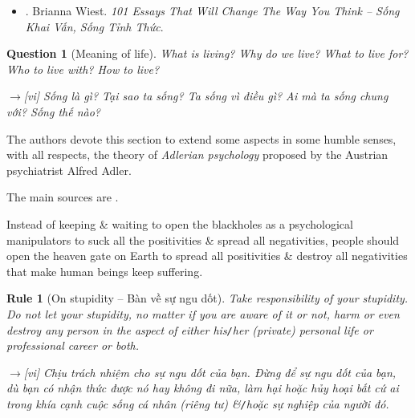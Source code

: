 \documentclass[12pt,oneside]{book}
\newtheorem{question}{Question}
\newtheorem{Rule}{Rule}
\begin{document}
\begin{itemize}
\begin{itemize}
		{\sf[en]$\to$[vi]} Hoàn thành các mục tiêu không phải là thành công. Mà việc bạn mở rộng bao nhiêu trong quá trình này mới là thành công.
		
		\item {\it``Your habits create your mood, \& your mood is a filter through which you experience your life.''}
		
		{\sf[en]$\to$[vi]} Thói quen của bạn tạo ra tâm trạng của bạn, \& tâm trạng của bạn là một bộ lọc để bạn trải nghiệm cuộc sống của mình.
		
		\item {\it``You must learn to let your conscious decisions dictate your day -- not your fears or impulses.''}
		
		{\sf[en]$\to$[vi]} Bạn phải học cách để những quyết định có ý thức quyết định ngày của bạn -- chứ không phải nỗi sợ hãi hay sự bốc đồng của bạn
	\end{itemize}	
	Với bản dịch tiếng Việt:
	\item \cite{Wiest_101_essays_VN}. {\sc Brianna Wiest}. {\it 101 Essays That Will Change The Way You Think -- Sống Khai Vấn, Sống Tỉnh Thức}.
\end{itemize}

\begin{question}[Meaning of life]
	What is living? Why do we live? What to live for? Who to live with? How to live?
	
	{\sf[en]$\to$[vi]} Sống là gì? Tại sao ta sống? Ta sống vì điều gì? Ai mà ta sống chung với? Sống thế nào?
\end{question}
The authors devote this section to extend some aspects in some humble senses, with all respects, the theory of {\it Adlerian psychology} proposed by the Austrian psychiatrist {\sc Alfred Adler}.

The main sources are \cite{Adler_science_living}.

Instead of keeping \& waiting to open the blackholes as a psychological manipulators to suck all the positivities \& spread all negativities, people should open the heaven gate on Earth to spread all positivities \& destroy all negativities that make human beings keep suffering.

\begin{Rule}[On stupidity -- Bàn về sự ngu dốt]
	Take responsibility of your stupidity. Do not let your stupidity, no matter if you are aware of it or not, harm or even destroy any person in the aspect of either his{\tt/}her (private) personal life or professional career or both.
	
	{\sf[en]$\to$[vi]} Chịu trách nhiệm cho sự ngu dốt của bạn. Đừng để sự ngu dốt của bạn, dù bạn có nhận thức được nó hay không đi nữa, làm hại hoặc hủy hoại bất cứ ai trong khía cạnh cuộc sống cá nhân (riêng tư) \&{\tt/}hoặc sự nghiệp của người đó.
\end{Rule}
\end{document}

